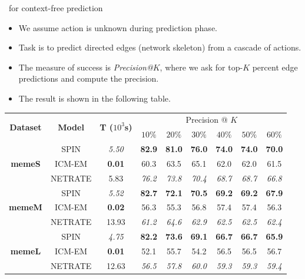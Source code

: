 \documentclass[first=dgreen,second=purple,logo=red]{aaltoslides}
\begin{document}
\begin{frame}{\spin\ for context-free prediction}
	\begin{itemize}
		\item We assume action is unknown during prediction phase.
		\item Task is to predict directed edges (network skeleton) from a cascade of actions.
		\item The measure of success is {\em Precision@$K$}, where we ask for top-$K$ percent edge predictions and compute the precision.
		\item The result is shown in the following table.
	\end{itemize}
			\begin{table}[t]
			\scriptsize
			\centering
			\begin{tabular}{|@{  }c@{  }|@{  }c@{  }|@{  }c@{  }|@{  }c@{  }|@{  }c@{  }|@{  }c@{  }|@{  }c@{  }|@{  }c@{  }|@{  }c@{  }|}
			  \hline
			\multirow{2}{*}{\textbf{Dataset}} & \multirow{2}{*}{\textbf{Model}} & \multirow{2}{*}{\textbf{T ({\tiny$10^3$s})}} & \multicolumn{6}{c|}{Precision @ $K$} \\ \cline{4-9}
			 & & & {$10\%$} & {$20\%$} & {$30\%$} & {$40\%$} & {$50\%$} & {$60\%$} \\ \hline
			\multirow{3}{*}{\textbf{memeS}}
			& SPIN & \em{5.50} & \textbf{82.9} & \textbf{81.0} & \textbf{76.0} & \textbf{74.0} & \textbf{74.0} & \textbf{70.0}  \\  
			& ICM-EM & \textbf{0.01} & {60.3} & {63.5} & {65.1} & {62.0} & {62.0} & {61.5}  \\ 
			& NETRATE & {5.83} & \em{76.2} & \em{73.8} & \em{70.4} & \em{68.7} & \em{68.7} & \em{66.8} \\ \hline 
			\multirow{3}{*}{\textbf{memeM}}
			& SPIN & \em{5.52} & \textbf{82.7} & \textbf{72.1} & \textbf{70.5} & \textbf{69.2} & \textbf{69.2} & \textbf{67.9}  \\  
			& ICM-EM & \textbf{0.02} & {56.3} & {55.3} & {56.8} & {57.4} & {57.4} & {56.3}  \\ 
			& NETRATE & {13.93} & \em{61.2} & \em{64.6} & \em{62.9} & \em{62.5} & \em{62.5} & \em{62.4}  \\ \hline 
			\multirow{3}{*}{\textbf{memeL}}
			& SPIN & \em{4.75} & \textbf{82.2} & \textbf{73.6} & \textbf{69.1} & \textbf{66.7} & \textbf{66.7} & \textbf{65.9}  \\  
			& ICM-EM & \textbf{0.01} & {52.1} & {55.7} & {54.2} & {56.5} & {56.5} & {56.7}  \\ 
			& NETRATE & {12.63} & \em{56.5} & \em{57.8} & \em{60.0} & \em{59.3} & \em{59.3} & \em{59.4}  \\ \hline
			\end{tabular}
			\end{table}
\end{frame}
\end{document}
